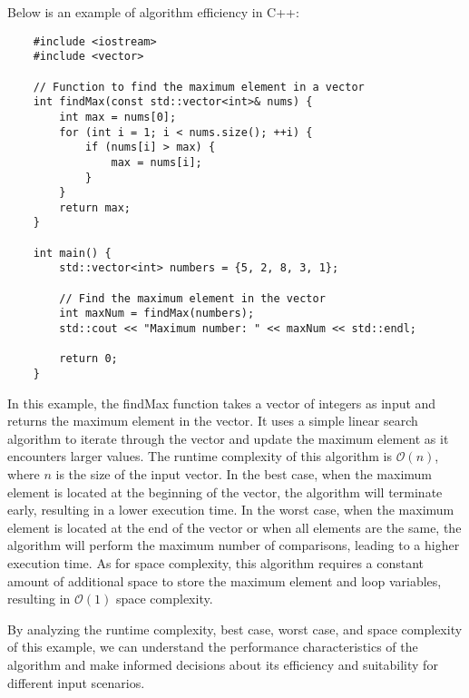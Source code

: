 \begin{solution}
    Below is an example of algorithm efficiency in C++: \\
    \horizontalline
    \begin{verbatim}
    #include <iostream>
    #include <vector>
    
    // Function to find the maximum element in a vector
    int findMax(const std::vector<int>& nums) {
        int max = nums[0];
        for (int i = 1; i < nums.size(); ++i) {
            if (nums[i] > max) {
                max = nums[i];
            }
        }
        return max;
    }
    
    int main() {
        std::vector<int> numbers = {5, 2, 8, 3, 1};
    
        // Find the maximum element in the vector
        int maxNum = findMax(numbers);
        std::cout << "Maximum number: " << maxNum << std::endl;
    
        return 0;
    }        
    \end{verbatim}
    
    \horizontalline

    \noindent In this example, the findMax function takes a vector of integers as input and returns the maximum element in the vector. It uses a simple linear search algorithm to iterate through the vector and update the maximum element as it encounters larger values. The runtime complexity of this algorithm is $\mathcal{O}(n)$, where $n$ is the size of the input vector. In the best case, when the maximum element is located at the beginning 
    of the vector, the algorithm will terminate early, resulting in a lower execution time. In the worst case, when the maximum element is located at the end of the vector or when all elements are the same, the algorithm will perform the maximum number of comparisons, leading to a higher execution time. As for space complexity, this algorithm requires a constant amount of additional space to store the maximum element and loop variables, 
    resulting in $\mathcal{O}(1)$ space complexity.

    \noindent By analyzing the runtime complexity, best case, worst case, and space complexity of this example, we can understand the performance characteristics of the algorithm and make informed decisions about its efficiency and suitability for different input scenarios.
\end{solution}